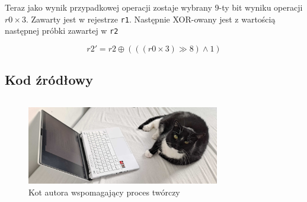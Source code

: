 \documentclass[12pt, a4paper]{article}
\begin{document}
Teraz jako wynik przypadkowej operacji zostaje wybrany 9-ty bit wyniku operacji $r0 \times 3$.
Zawarty jest w rejestrze \verb|r1|. Następnie XOR-owany jest z wartością następnej próbki zawartej w \verb|r2|

\begin{equation}
	r2' = r2 \oplus \left( \left( (r0 \times 3) \gg 8 \right) \land 1 \right)
\end{equation}


\subsection{Kod źródłowy}

\inputminted[linenos=true,escapeinside=@@,fontfamily=phv]{asm}{../src/main.S}

\newpage
\printbibliography %

\newpage

\begin{figure}
	\centering
	\includegraphics[width=0.75\textwidth]{img/kot_enter.jpg}
	\caption{Kot autora wspomagający proces twórczy}
\end{figure}
\end{document}
